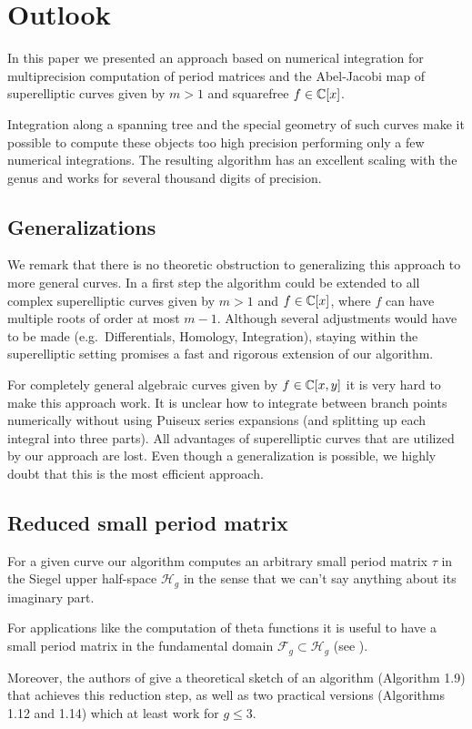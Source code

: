 \documentclass[main.tex]{subfiles}
\begin{document}
  \newpage

  \section{Outlook}\label{sec:outlook}

  In this paper we presented an approach based on numerical integration for multiprecision computation of period matrices and the Abel-Jacobi map of superelliptic curves given by
 $m > 1$ and squarefree $f \in \mathbb{C}[x]$.
 
  Integration along a spanning tree and the special geometry of such curves make it possible to compute these objects too high precision performing only a few numerical integrations.
  The resulting algorithm has an excellent scaling with the genus and works for several thousand digits of precision.
  
  \subsection{Generalizations}
  
  We remark that there is no theoretic obstruction to generalizing this approach to more general curves.
  In a first step the algorithm could be extended to all complex superelliptic curves given by $m > 1$ and $f \in \mathbb{C}[x]$, where $f$ can have multiple roots of order at most $m-1$.
  Although several adjustments would have to be made (e.g.\ Differentials, Homology, Integration), staying within the superelliptic setting promises a fast and rigorous extension of our algorithm. 
  
  \medskip
  
  For completely general algebraic curves given by $f \in \mathbb{C}[x,y]$ it is very hard to make this approach work.
  It is unclear how to integrate between branch points numerically without using Puiseux series expansions (and splitting up each integral into three parts).  
  All advantages of superelliptic curves that are utilized by our approach are lost.
  Even though a generalization is possible, we highly doubt that this is the most efficient approach.
  
  \subsection{Reduced small period matrix}

   For a given curve our algorithm computes an arbitrary small period matrix $\tau$ in the Siegel upper half-space $\mathcal{H}_g$ in the sense that we can't say
   anything about its imaginary part. 
   
   For applications like the computation of theta functions it is useful
   to have a small period matrix in the fundamental domain $\mathcal{F}_g \subset \mathcal{H}_g$ (see \cite[\S 1.3]{PlaneQuarticsCM}).
  
   Moreover, the authors of \cite{PlaneQuarticsCM} give a theoretical sketch of an algorithm (Algorithm 1.9) that achieves this reduction step, as well as two practical versions (Algorithms 1.12 and 1.14) which at least
   work for $g \le 3$.

  \biblio
  
\end{document}
